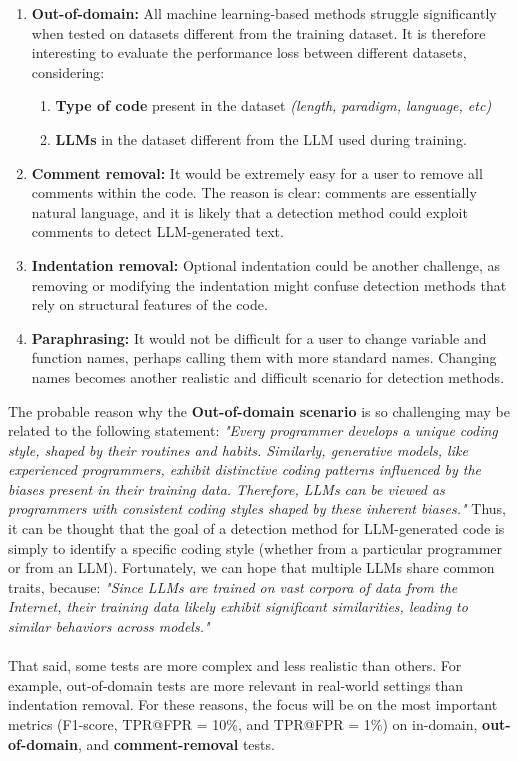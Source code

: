 \begin{enumerate}
\item \textbf{Out-of-domain:} All machine learning-based methods struggle significantly 
when tested on datasets different from the training dataset. It is therefore 
interesting to evaluate the performance loss between different datasets, considering:
    \begin{enumerate}
    \item \textbf{Type of code} present in the dataset \textit{(length, paradigm, language, etc)}
    \item \textbf{LLMs} in the dataset different from the LLM used during training.
    \end{enumerate}
\item \textbf{Comment removal:} It would be extremely easy for a user to remove all 
comments within the code. The reason is clear: comments are essentially 
natural language, and it is likely that a detection method could exploit 
comments to detect LLM-generated text.

\item \textbf{Indentation removal:} Optional indentation could be another challenge, 
as removing or modifying the indentation might confuse detection methods 
that rely on structural features of the code.

\item \textbf{Paraphrasing:} It would not be difficult for a user to change variable and 
function names, perhaps calling them with more standard names. 
Changing names becomes another realistic and difficult scenario for detection methods.
\end{enumerate}

The probable reason why the \textbf{Out-of-domain scenario} is so challenging 
may be related to the following statement:
\textit{"Every programmer develops a unique coding style, shaped by their 
routines and habits. Similarly, generative models, like experienced 
programmers, exhibit distinctive coding patterns influenced by the 
biases present in their training data. Therefore, LLMs can be viewed 
as programmers with consistent coding styles shaped by these inherent biases."}
\cite{ye2023uncovering}
Thus, it can be thought that the goal of a detection method for 
LLM-generated code is simply to identify a specific coding style 
(whether from a particular programmer or from an LLM). Fortunately, 
we can hope that multiple LLMs share common traits, because:
\textit{"Since LLMs are trained on vast corpora of data from the Internet, 
their training data likely exhibit significant similarities, leading 
to similar behaviors across models."}\cite{guo2024biscope}
\\\\
That said, some tests are more complex and less realistic 
than others. For example, out-of-domain tests are more relevant 
in real-world settings than indentation removal. For these reasons, 
the focus will be on the most important metrics 
(F1-score, TPR@FPR = 10\%, and TPR@FPR = 1\%) 
on in-domain, \textbf{out-of-domain}, and \textbf{comment-removal} tests.